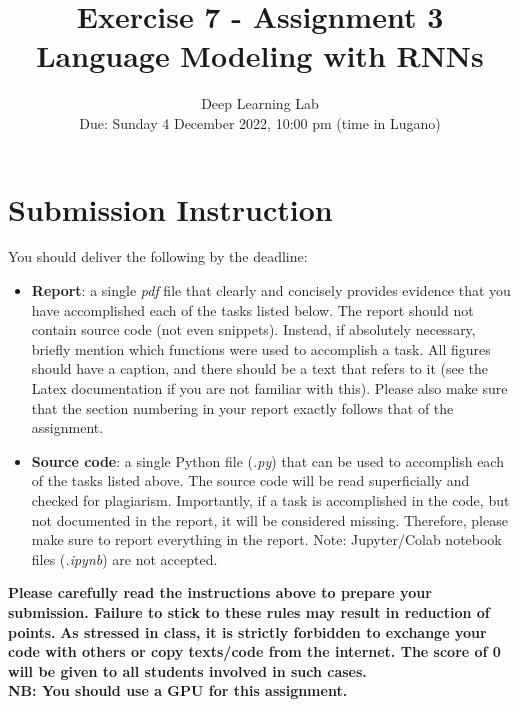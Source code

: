 \documentclass[a4paper,11pt]{article}
\title{Exercise 7 - \textbf{Assignment 3}\\
\textbf{Language Modeling with RNNs}}
\author{Deep Learning Lab\\
Due: Sunday 4 December 2022, 10:00 pm (time in Lugano)}
\begin{document}
\maketitle

\section*{Submission Instruction}
You should deliver the following by the deadline:
\begin{itemize}
 \item \textbf{Report}: a single \emph{pdf} file that clearly and concisely provides evidence that you have accomplished each of the tasks listed below. The report should not contain source code (not even snippets). Instead, if absolutely necessary, briefly mention which functions were used to accomplish a task. All figures should have a caption, and there should be a text that refers to it (see the Latex documentation if you are not familiar with this). Please also make sure that the section numbering in your report exactly follows that of the assignment.
 \item \textbf{Source code}: a single Python file (\emph{.py}) that can be used to accomplish each of the tasks listed above.  The source code will be read superficially and checked for plagiarism.
 Importantly, if a task is accomplished in the code, but not documented in the report, it will be considered missing. Therefore, please make sure to report everything in the report. Note: Jupyter/Colab notebook files (\emph{.ipynb}) are not accepted.
\end{itemize}

\textbf{Please carefully read the instructions above to prepare your submission. Failure to stick to these rules may result in reduction of points.}
\textbf{As stressed in class, it is strictly forbidden to exchange your code with others or copy texts/code from the internet. The score of 0 will be given to all students involved in such cases.}\\

\textbf{NB: You should use a GPU for this assignment.}

\end{document}

